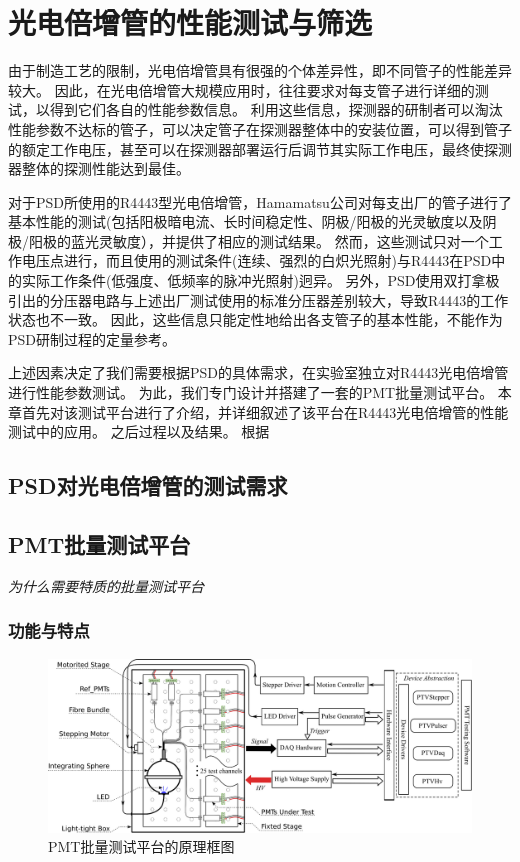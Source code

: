 \chapter{光电倍增管的性能测试与筛选}
\label{ch:pmt_test}
由于制造工艺的限制，光电倍增管具有很强的个体差异性，即不同管子的性能差异较大。
因此，在光电倍增管大规模应用时，往往要求对每支管子进行详细的测试，以得到它们各自的性能参数信息。
利用这些信息，探测器的研制者可以淘汰性能参数不达标的管子，可以决定管子在探测器整体中的安装位置，可以得到管子的额定工作电压，甚至可以在探测器部署运行后调节其实际工作电压，最终使探测器整体的探测性能达到最佳。

对于PSD所使用的R4443型光电倍增管，Hamamatsu公司对每支出厂的管子进行了基本性能的测试(包括阳极暗电流、长时间稳定性、阴极/阳极的光灵敏度以及阴极/阳极的蓝光灵敏度），并提供了相应的测试结果。
然而，这些测试只对一个工作电压点进行，而且使用的测试条件(连续、强烈的白炽光照射)与R4443在PSD中的实际工作条件(低强度、低频率的脉冲光照射)迥异。
另外，PSD使用双打拿极引出的分压器电路与上述出厂测试使用的标准分压器差别较大，导致R4443的工作状态也不一致。
因此，这些信息只能定性地给出各支管子的基本性能，不能作为PSD研制过程的定量参考。

上述因素决定了我们需要根据PSD的具体需求，在实验室独立对R4443光电倍增管进行性能参数测试。
为此，我们专门设计并搭建了一套的PMT批量测试平台。
本章首先对该测试平台进行了介绍，并详细叙述了该平台在R4443光电倍增管的性能测试中的应用。
之后过程以及结果。
根据

\section{PSD对光电倍增管的测试需求}

\section{PMT批量测试平台}
\label{sec:pmt_test:testbench}
\emph{为什么需要特质的批量测试平台}

\subsection{功能与特点}

\begin{figure}[htb]
	\centering
	\includegraphics[width=\textwidth]{chap/pmt_test/fig/testbench_schematic.eps}
	\caption{PMT批量测试平台的原理框图}
	\label{fig:pmt_test:testbench_schematic}
\end{figure}

